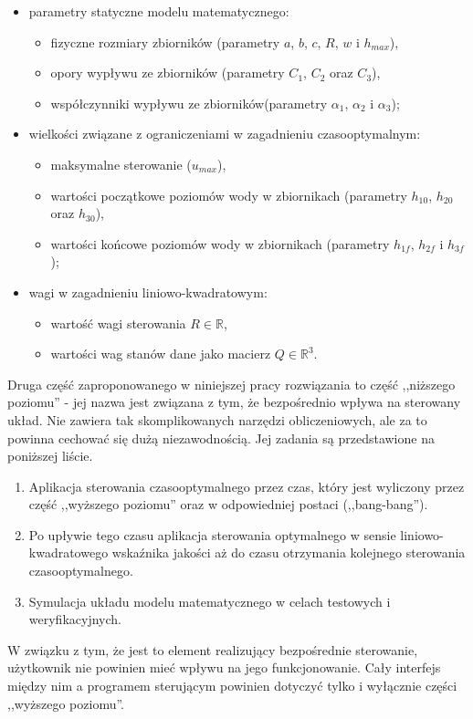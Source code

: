 \begin{itemize}
    \item parametry statyczne modelu matematycznego:
    \begin{itemize}
        \item fizyczne rozmiary zbiorników (parametry $a$, $b$, $c$, $R$, $w$ i $h_{max}$),
        \item opory wypływu ze zbiorników (parametry $C_{1}$, $C_{2}$ oraz $C_{3}$),
        \item współczynniki wypływu ze zbiorników(parametry $\alpha_{1}$, $\alpha_{2}$ i $\alpha_{3}$);
    \end{itemize}
    \item wielkości związane z ograniczeniami w zagadnieniu czasooptymalnym:
    \begin{itemize}
        \item maksymalne sterowanie ($u_{max}$),
        \item wartości początkowe poziomów wody w zbiornikach (parametry $h_{10}$, $h_{20}$ oraz $h_{30}$),
        \item wartości końcowe poziomów wody w zbiornikach (parametry $h_{1f}$, $h_{2f}$ i $h_{3f}$);
    \end{itemize}
    \item wagi w zagadnieniu liniowo-kwadratowym:
    \begin{itemize}
        \item wartość wagi sterowania $R \in \mathbb{R}$,
        \item wartości wag stanów dane jako macierz $Q \in \mathbb{R}^{3}$.
    \end{itemize}
\end{itemize}

Druga część zaproponowanego w niniejszej pracy rozwiązania to część ,,niższego poziomu'' - jej nazwa jest związana z tym, że bezpośrednio wpływa na sterowany układ. Nie zawiera tak skomplikowanych narzędzi obliczeniowych, ale za to powinna cechować się dużą niezawodnością. Jej zadania są przedstawione na poniższej liście.

\begin{enumerate}
    \item Aplikacja sterowania czasooptymalnego przez czas, który jest wyliczony przez część ,,wyższego poziomu'' oraz w odpowiedniej postaci (,,bang-bang'').
    \item Po upływie tego czasu aplikacja sterowania optymalnego w sensie liniowo-kwadratowego wskaźnika jakości aż do czasu otrzymania kolejnego sterowania czasooptymalnego.
    \item Symulacja układu modelu matematycznego w celach testowych i weryfikacyjnych.
\end{enumerate}

W związku z tym, że jest to element realizujący bezpośrednie sterowanie, użytkownik nie powinien mieć wpływu na jego funkcjonowanie. Cały interfejs między nim a programem sterującym powinien dotyczyć tylko i wyłącznie części ,,wyższego poziomu''.